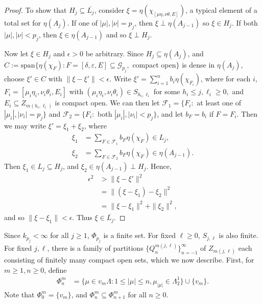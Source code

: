 \documentclass[12pt]{amsart}
\newcommand{\sse}{\subseteq}
\newcommand{\spn}{\text{span}}
\newcommand{\mc}[1]{\mathcal{#1}}
\newcommand{\de}{\delta}
\newcommand{\ep}{\varepsilon}
\newcommand{\eps}{\epsilon}
\renewcommand{\th}{\theta}
\newcommand{\La}{\Lambda}
\theoremstyle{plain} %
\theoremstyle{definition} %
\begin{document}
\begin{proof}
 
    To show that $H_j \sse \overline{L_j}$, consider $\xi = \eta(\chi_{[\mu\eta, \nu\th, E]})$, a typical element of a total set for $\eta(A_j)$. If one of $|\mu|, |\nu| = p_j$, then $\xi \perp \eta(A_{j-1})$ so $\xi \in H_j$. If both $|\mu|, |\nu| < p_j$, then $\xi \in \eta(A_{j-1})$ and so $\xi \perp H_j$.


    Now let $\xi \in H_j$ and $\eps > 0$ be arbitrary.
    Since $H_j \sse \eta(A_j)$, and $C := \spn\{\eta(\chi_F) : F = [\de, \ep, E] \sse \mc{G}_{p_j},$ compact open$\}$ is dense in $\eta(A_j)$, choose $\xi' \in C$ with $\|\xi - \xi'\| < \eps$. Write $\xi' = \sum_{i=1}^n b_i \eta(\chi_{F_i})$, where for each $i$, $F_i = [\mu_i \eta_i, \nu_i \th_i, E_i]$ with $(\mu_i \eta_i, \nu_i \th_i) \in S_{h_i, \ell_i}$ for some $h_i \le j, \ell_i \ge 0,$ and $E_i \sse Z_{m(h_i, \ell_i)}$ is compact open.
%
    We can then let $\mc{F}_1 = \{F_i :$ at least one of $|\mu_i|, |\nu_i| = p_j\}$ and $\mc{F}_2 = \{F_i :$ both $|\mu_i|, |\nu_i| < p_j\}$, and let $b_F = b_i$ if $F = F_i$. Then we may write $\xi' = \xi_1 + \xi_2$, where
    \begin{align*}
        \xi_1 &= \sum_{F \in \mc{F}_1} b_F \eta(\chi_F) \in L_j,\\
        \xi_2 &= \sum_{F \in \mc{F}_2} b_F \eta(\chi_F) \in \eta(A_{j-1}).
    \end{align*}
    Then $\xi_1 \in L_j \sse H_j$, and $\xi_2 \in \eta(A_{j-1}) \perp H_j$. Hence,
    \begin{align*}
        \eps^2 &> \|\xi - \xi'\|^2\\
        &= \|(\xi - \xi_1) - \xi_2\|^2\\
        &= \|\xi - \xi_1\|^2 + \|\xi_2\|^2,
    \end{align*}
    and so $\|\xi - \xi_1\| < \eps$. Thus $\xi \in \overline{L_j}$.
\end{proof}


Since $k_{p_j} < \infty$ for all $j \ge 1$, $\Phi_{p_j}$ is a finite set. For fixed $\ell \ge 0$, $S_{j,\ell}$ is also finite. For fixed $j, \ell$, there is a family of partitions $\{Q^{m(j,\ell)}_n\}_{n=-1}^{\infty}$ of $Z_{m(j,\ell)}$ each consisting of finitely many compact open sets, which we now describe. First, for $m \geq 1, n \geq 0$, define
\begin{align*}
    \Phi^m_n &= \{\mu \in v_m \La : 1 \le |\mu| \leq n, \mu_{|\mu|} \in \La_2^1\} \cup \{v_m\}.
\end{align*}
Note that $\Phi_0^m = \{v_m\}$, and $\Phi_n^m \sse \Phi_{n+1}^m$ for all $n \ge 0$. 
\end{document}
